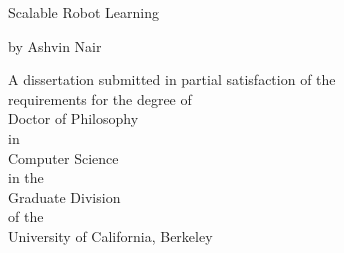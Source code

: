 
\begin{titlepage}
    \begin{center}
        \large  

        \hfill


        \begingroup
            \normalsize{Scalable Robot Learning} %
        \endgroup
        
	

        \vfill

        \medskip

        \normalsize{by} 
        \vfill  
        \medskip
        \normalsize{Ashvin Nair}

        \vfill                      

    \end{center}  

\thispagestyle{empty}



\vfill

\begin{center}
\begin{spacing}{2.0}
A dissertation submitted in partial satisfaction of the \\
requirements for the degree of  \\ 
Doctor of Philosophy \\ 
in \\ 
Computer Science \\
in the \\
Graduate Division \\
of the \\ 
University of California, Berkeley
\end{spacing}
\end{center}


\end{titlepage}
